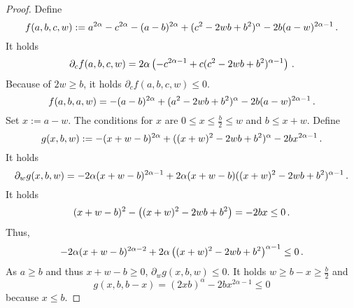 %
\begin{proof}
	Define
	\begin{equation*}
		f(a,b,c,w) := a^{2\alpha}-c^{2\alpha}-(a-b)^{2\alpha}+(c^2 - 2 w b + b^2)^\alpha 
			- 2 b (a-w)^{2\alpha-1}
			\, .
	\end{equation*} 
	It holds
	\begin{equation*}
		\partial_c f(a,b,c,w) =2\alpha\left( -c^{2\alpha-1}+c(c^2 - 2 w b + b^2)^{\alpha-1} \right)
		\, .
	\end{equation*} 
	Because of $2w \geq b$, it holds $\partial_c f(a,b,c,w) \leq 0$.
	\begin{equation*}
		f(a,b,a,w) = -(a-b)^{2\alpha}+(a^2 - 2 w b + b^2)^\alpha - 2 b (a-w)^{2\alpha-1}
		\, .
	\end{equation*}
	Set $x := a-w$.
	The conditions for $x$ are $0 \leq x \leq \frac b2 \leq w$ and $b \leq x+w$. Define
	\begin{equation*}
		g(x,b,w) := -(x+w-b)^{2\alpha}+((x+w)^2 - 2 w b + b^2)^\alpha - 2 b x^{2\alpha-1}
		\, .
	\end{equation*}
	It holds
	\begin{equation*}
		\partial_w g(x,b,w) =-2\alpha(x+w-b)^{2\alpha-1}+2\alpha(x+w-b)((x+w)^2 - 2 w b + b^2)^{\alpha-1} 
		\, .
	\end{equation*}
	It holds
	\begin{equation*}
		(x+w-b)^2 - \left( (x+w)^2 - 2 w b + b^2 \right) = -2 b x \leq 0
		\, .
	\end{equation*}
	Thus,
	\begin{equation*}
		-2\alpha(x+w-b)^{2\alpha-2} + 2\alpha\left( (x+w)^2 - 2 w b + b^2 \right)^{\alpha-1} \leq 0
		\, .
	\end{equation*}
	As $a \geq b$ and thus $x+w-b \geq 0$, $\partial_w g(x,b,w) \leq 0$.
	It holds $w \geq b-x \geq \frac b2$ and 
	\begin{equation*}
		g(x,b,b-x)
		=
		(2 x b)^\alpha - 2 b x^{2\alpha-1}
		\leq 0
	\end{equation*}
	because $x\leq b$.
\end{proof}
%
%
%
%

